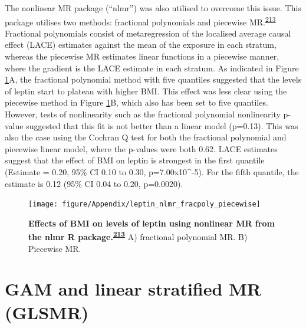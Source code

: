 \documentclass[11pt,twoside]{bristolthesis}
\begin{document}
The nonlinear MR package (``nlmr'') was also utilised to overcome this issue. This package utilises two methods: fractional polynomials and piecewise MR.\textsuperscript{\protect\hyperlink{ref-Staley2017}{213}} Fractional polynomials consist of metaregression of the localised average causal effect (LACE) estimates against the mean of the exposure in each stratum, whereas the piecewise MR estimates linear functions in a piecewise manner, where the gradient is the LACE estimate in each stratum. As indicated in Figure \ref{fig:leptin-nlmr}A, the fractional polynomial method with five quantiles suggested that the levels of leptin start to plateau with higher BMI. This effect was less clear using the piecewise method in Figure \ref{fig:leptin-nlmr}B, which also has been set to five quantiles. However, tests of nonlinearity such as the fractional polynomial nonlinearity p-value suggested that this fit is not better than a linear model (p=0.13). This was also the case using the Cochran Q test for both the fractional polynomial and piecewise linear model, where the p-values were both 0.62. LACE estimates suggest that the effect of BMI on leptin is strongest in the first quantile (Estimate = 0.20, 95\% CI 0.10 to 0.30, p=7.00x10\^{}-5). For the fifth quantile, the estimate is 0.12 (95\% CI 0.04 to 0.20, p=0.0020).



\begin{figure}

{\centering \texttt{[image: figure/Appendix/leptin\_nlmr\_fracpoly\_piecewise]} 

}

\caption[Effects of BMI on levels of leptin using nonlinear MR]{\textbf{Effects of BMI on levels of leptin using nonlinear MR from the nlmr R package.\textsuperscript{\protect\hyperlink{ref-Staley2017}{213}}} A) fractional polynomial MR. B) Piecewise MR.}\label{fig:leptin-nlmr}
\end{figure}
\hypertarget{gam-and-linear-stratified-mr-glsmr}{%
\section{GAM and linear stratified MR (GLSMR)}\label{gam-and-linear-stratified-mr-glsmr}}
\end{document}
